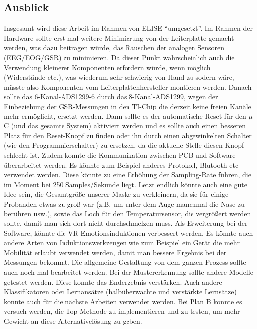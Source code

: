 \subsection{Ausblick} \label{ausblick-subsec}




Insgesamt wird diese Arbeit  im Rahmen von ELISE ``umgesetzt''.
Im Rahmen der Hardware sollte erst mal weitere Minimierung von der Leiterplatte gemacht werden, was dazu beitragen würde, das Rauschen der analogen Sensoren (EEG/EOG/GSR) zu minimieren. 
Da dieser Punkt wahrscheinlich auch die Verwendung kleinerer Komponenten erfordern würde, wenn möglich (Widerstände etc.), was wiederum sehr schwierig von Hand zu sodern wäre, müsste also Komponenten vom Leiterplattenhersteller montieren werden. 
Danach sollte das 6-Kanal-ADS1299-6 durch das 8-Kanal-ADS1299, wegen der Einbeziehung der GSR-Messungen in den TI-Chip die derzeit keine freien Kanäle mehr ermöglicht, ersetzt werden. 
Dann sollte es der automatische Reset für den $\mu$C  (und das gesamte System) aktiviert werden und es sollte auch einen besseren Platz für den Reset-Knopf zu finden oder ihn durch einen abgewinkelten Schalter (wie den Programmierschalter) zu ersetzen, da die aktuelle Stelle diesen Knopf schlecht ist. 
Zudem konnte  die Kommunikation zwischen PCB und Software überarbeitet werden. 
Es könnte zum Beispiel anderes Protokoll, Blutooth etc verwendet werden. 
Diese könnte zu eine Erhöhung der Sampling-Rate führen, die im Moment bei 250 Samples/Sekunde liegt. 
Letzt endlich könnte auch eine gute Idee sein, die Gesamtgröße unserer Maske zu verkleinern, da sie für einige Probanden etwas zu groß war (z.B. um unter dem Auge manchmal die Nase zu berühren usw.), sowie  das Loch für den Temperatursensor, die vergrößert werden sollte, damit man sich dort nicht durchschmelzen muss.
Als Erweiterung bei der Software, könnte die VR-Emotionsinduktionen verbessert werden. 
Es könnte auch andere Arten von Induktionswerkzeugen wie zum Beispiel ein Gerät die mehr Mobilität erlaubt verwendet werden, damit man bessere Ergebnis bei der Messungen bekommt. 
Die allgemeine Gestaltung von dem ganzen Prozess sollte auch noch mal bearbeitet werden.
Bei der Mustererkennung sollte andere Modelle getestet werden. 
Diese konnte das Endergebnis verstärken. Auch andere Klassifikatoren oder Lernansätze (halbüberwachte und verstärkte Lernsätze) konnte auch für die nächste Arbeiten verwendet werden.
Bei Plan B konnte es versuch werden, die Top-Methode zu implementieren und zu testen, um mehr Gewicht an diese Alternativelösung zu geben.